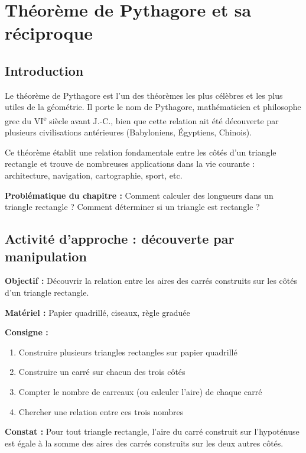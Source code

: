 \chapter{Théorème de Pythagore et sa réciproque}

\section{Introduction}
Le théorème de Pythagore est l'un des théorèmes les plus célèbres et les plus utiles de la géométrie. Il porte le nom de Pythagore, mathématicien et philosophe grec du VI\textsuperscript{e} siècle avant J.-C., bien que cette relation ait été découverte par plusieurs civilisations antérieures (Babyloniens, Égyptiens, Chinois).

Ce théorème établit une relation fondamentale entre les côtés d'un triangle rectangle et trouve de nombreuses applications dans la vie courante : architecture, navigation, cartographie, sport, etc.

\textbf{Problématique du chapitre :} Comment calculer des longueurs dans un triangle rectangle ? Comment déterminer si un triangle est rectangle ?

\section{Activité d'approche : découverte par manipulation}

\textbf{Objectif :} Découvrir la relation entre les aires des carrés construits sur les côtés d'un triangle rectangle.

\textbf{Matériel :} Papier quadrillé, ciseaux, règle graduée

\textbf{Consigne :}
\begin{enumerate}
    \item Construire plusieurs triangles rectangles sur papier quadrillé
    \item Construire un carré sur chacun des trois côtés
    \item Compter le nombre de carreaux (ou calculer l'aire) de chaque carré
    \item Chercher une relation entre ces trois nombres
\end{enumerate}

\textbf{Constat :} Pour tout triangle rectangle, l'aire du carré construit sur l'hypoténuse est égale à la somme des aires des carrés construits sur les deux autres côtés.

